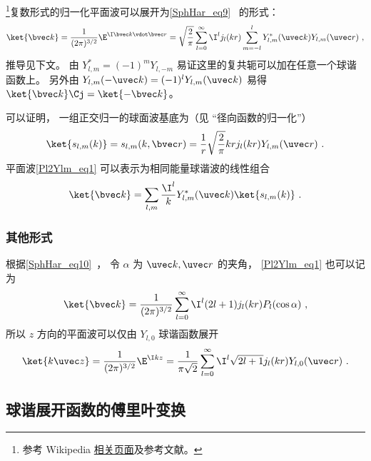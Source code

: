 

\footnote{参考 Wikipedia \href{https://en.wikipedia.org/wiki/Plane_wave_expansion}{相关页面}及参考文献。}复数形式的归一化平面波可以展开为\autoref{SphHar_eq9}~ 的形式：
\begin{equation}\label{Pl2Ylm_eq1}
\ket{\bvec k} = \frac{1}{(2\pi)^{3/2}}\E^{\I \bvec k \vdot \bvec r} = \sqrt{\frac{2}{\pi}} \sum_{l=0}^{\infty} \I^l  j_l(kr) \sum_{m=-l}^l Y_{l,m}^*(\uvec k) Y_{l,m}(\uvec r)~,
\end{equation}
推导见下文。 由 $Y_{l,m}^* = (-1)^m Y_{l,-m}$ 易证这里的复共轭可以加在任意一个球谐函数上。 另外由 $Y_{l,m}(-\uvec k) = (-1)^l Y_{l,m}(\uvec k)$ 易得 $\ket{\bvec k}\Cj = \ket{-\bvec k}$。

可以证明， 一组正交归一的球面波基底为（见 “径向函数的归一化”）
\begin{equation}
\ket{s_{l,m}(k)} = s_{l,m}(k,\bvec r) = \frac{1}{r}\sqrt{\frac{2}{\pi}}kr j_l(kr) Y_{l,m}(\uvec r)~.
\end{equation}
平面波\autoref{Pl2Ylm_eq1} 可以表示为相同能量球谐波的线性组合
\begin{equation}\label{Pl2Ylm_eq3}
\ket{\bvec k} = \sum_{l,m}\frac{\I^l}{k} Y_{l,m}^*(\uvec k)\ket{s_{l,m}(k)} ~.
\end{equation}

\subsubsection{其他形式}
根据\autoref{SphHar_eq10}~， 令 $\alpha$ 为 $\uvec k, \uvec r$ 的夹角， \autoref{Pl2Ylm_eq1} 也可以记为
\begin{equation}\label{Pl2Ylm_eq2}
\ket{\bvec k} = \frac{1}{(2\pi)^{3/2}} \sum_{l=0}^{\infty} \I^l (2l+1) j_l(kr) P_l(\cos\alpha)~,
\end{equation}
所以 $z$ 方向的平面波可以仅由 $Y_{l,0}$ 球谐函数展开
\begin{equation}
\ket{k\uvec z} = \frac{1}{(2\pi)^{3/2}}\E^{\I kz}
= \frac{1}{\pi\sqrt 2} \sum_{l=0}^{\infty} \I^l \sqrt{2l+1} j_l(kr) Y_{l,0}(\uvec r)~.
\end{equation}

\subsection{球谐展开函数的傅里叶变换}

